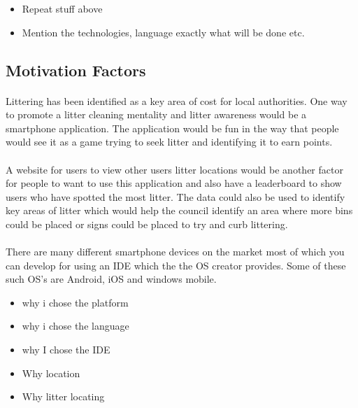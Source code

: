 \documentclass{article}
\begin{document}
\begin{itemize}
\item Repeat stuff above
\item Mention the technologies, language exactly what will be done etc.
\end{itemize}


\subsection{Motivation Factors}

\paragraph{}
\label{par:2par}

Littering has been identified as a key area of cost for local authorities. 
One way to promote a litter cleaning mentality and litter awareness would be a smartphone application. The application would be fun in the way that people would see it as a game trying to seek litter and identifying it to earn points.

\paragraph{}
\label{par:2par}

A website for users to view other users litter locations would be another factor for people to want to use this application and also have a leaderboard to show users who have spotted the most litter.
The data could also be used to identify key areas of litter which would help the council identify an area where more bins could be placed or signs could be placed to try and curb littering.

\paragraph{}
\label{par:2par}
There are many different smartphone devices on the market most of which you can develop for using an IDE which the the OS creator provides. Some of these such OS's are Android, iOS and windows mobile. 

\begin{itemize}
\item why i chose the platform
\item why i chose the language
\item why I chose the IDE
\item Why location
\item Why litter locating
\end{itemize}
\end{document}
